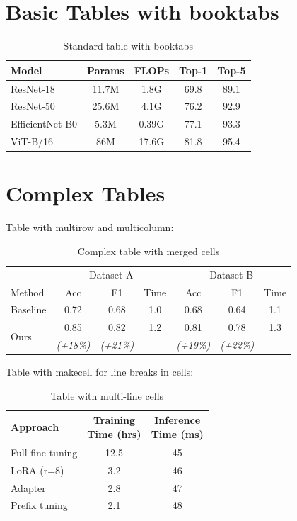\documentclass[12pt,a4paper]{article}
\begin{document}
\section{Basic Tables with booktabs}\label{sec:basic-tables}
\begin{table}[htbp]
\centering
\caption{Standard table with booktabs}\label{tab:basic}
\begin{tabular}{lcccc}
\toprule
Model & Params & FLOPs & Top-1 & Top-5 \\
\midrule
ResNet-18 & 11.7M & 1.8G & 69.8 & 89.1 \\
ResNet-50 & 25.6M & 4.1G & 76.2 & 92.9 \\
EfficientNet-B0 & 5.3M & 0.39G & 77.1 & 93.3 \\
ViT-B/16 & 86M & 17.6G & 81.8 & 95.4 \\
\bottomrule
\end{tabular}
\end{table}

\section{Complex Tables}\label{sec:complex-tables}
Table with multirow and multicolumn:
\begin{table}[htbp]
\centering
\caption{Complex table with merged cells}\label{tab:complex}
\begin{tabular}{lcccccc}
\toprule
& \multicolumn{3}{c}{Dataset A} & \multicolumn{3}{c}{Dataset B} \\
\cmidrule(lr){2-4} \cmidrule(lr){5-7}
Method & Acc & F1 & Time & Acc & F1 & Time \\
\midrule
Baseline & 0.72 & 0.68 & 1.0 & 0.68 & 0.64 & 1.1 \\
\multirow{2}{*}{Ours} & 0.85 & 0.82 & 1.2 & 0.81 & 0.78 & 1.3 \\
& \textit{(+18\%)} & \textit{(+21\%)} & & \textit{(+19\%)} & \textit{(+22\%)} & \\
\bottomrule
\end{tabular}
\end{table}

Table with makecell for line breaks in cells:
\begin{table}[htbp]
\centering
\caption{Table with multi-line cells}\label{tab:makecell}
\begin{tabular}{lcc}
\toprule
Approach & \makecell{Training\\Time (hrs)} & \makecell{Inference\\Time (ms)} \\
\midrule
Full fine-tuning & 12.5 & 45 \\
LoRA (r=8) & 3.2 & 46 \\
Adapter & 2.8 & 47 \\
Prefix tuning & 2.1 & 48 \\
\bottomrule
\end{tabular}
\end{table}
\end{document}
